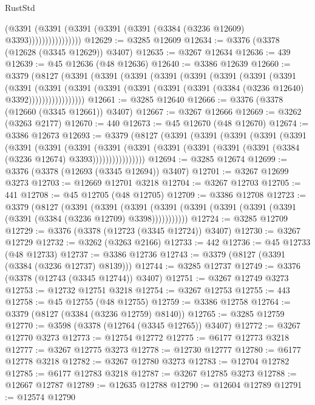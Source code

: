 \begin{lexlean}{RustStd}
\begin{coremodule}
                        (@3391
                          (@3391 (@3391 (@3391 (@3391 (@3384 (@3236 @12609) @3393))))))))))))))))
@12629 := @3285 @12609
@12634 := @3376 (@3378 (@12628 (@3345 @12629)) @3407)
@12635 := @3267 @12634
@12636 := 439
@12639 := @45 @12636 (@48 @12636)
@12640 := @3386 @12639
@12660 := @3379
    (@8127
      (@3391
        (@3391
          (@3391
            (@3391
              (@3391
                (@3391
                  (@3391
                    (@3391
                      (@3391
                        (@3391
                          (@3391
                            (@3391 (@3391 (@3391 (@3391 (@3384 (@3236 @12640) @3392)))))))))))))))))
@12661 := @3285 @12640
@12666 := @3376 (@3378 (@12660 (@3345 @12661)) @3407)
@12667 := @3267 @12666
@12669 := @3262 (@3263 @2177)
@12670 := 440
@12673 := @45 @12670 (@48 @12670)
@12674 := @3386 @12673
@12693 := @3379
    (@8127
      (@3391
        (@3391
          (@3391
            (@3391
              (@3391
                (@3391
                  (@3391
                    (@3391
                      (@3391
                        (@3391
                          (@3391 (@3391 (@3391 (@3391 (@3384 (@3236 @12674) @3393))))))))))))))))
@12694 := @3285 @12674
@12699 := @3376 (@3378 (@12693 (@3345 @12694)) @3407)
@12701 := @3267 @12699 @3273
@12703 := @12669 @12701 @3218
@12704 := @3267 @12703
@12705 := 441
@12708 := @45 @12705 (@48 @12705)
@12709 := @3386 @12708
@12723 := @3379
    (@8127
      (@3391
        (@3391
          (@3391 (@3391 (@3391 (@3391 (@3391 (@3391 (@3391 (@3384 (@3236 @12709) @3398)))))))))))
@12724 := @3285 @12709
@12729 := @3376 (@3378 (@12723 (@3345 @12724)) @3407)
@12730 := @3267 @12729
@12732 := @3262 (@3263 @2166)
@12733 := 442
@12736 := @45 @12733 (@48 @12733)
@12737 := @3386 @12736
@12743 := @3379 (@8127 (@3391 (@3384 (@3236 @12737) @8139)))
@12744 := @3285 @12737
@12749 := @3376 (@3378 (@12743 (@3345 @12744)) @3407)
@12751 := @3267 @12749 @3273
@12753 := @12732 @12751 @3218
@12754 := @3267 @12753
@12755 := 443
@12758 := @45 @12755 (@48 @12755)
@12759 := @3386 @12758
@12764 := @3379 (@8127 (@3384 (@3236 @12759) @8140))
@12765 := @3285 @12759
@12770 := @3598 (@3378 (@12764 (@3345 @12765)) @3407)
@12772 := @3267 @12770 @3273
@12773 := @12754 @12772
@12775 := @6177 @12773 @3218
@12777 := @3267 @12775 @3273
@12778 := @12730 @12777
@12780 := @6177 @12778 @3218
@12782 := @3267 @12780 @3273
@12783 := @12704 @12782
@12785 := @6177 @12783 @3218
@12787 := @3267 @12785 @3273
@12788 := @12667 @12787
@12789 := @12635 @12788
@12790 := @12604 @12789
@12791 := @12574 @12790

\end{coremodule}
\end{lexlean}
